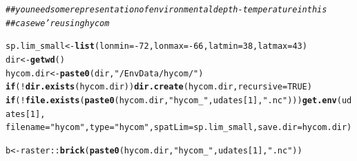 \documentclass{article}\usepackage[]{graphicx}\usepackage[]{color}
\makeatletter
\newcommand{\hlnum}[1]{\textcolor[rgb]{0.686,0.059,0.569}{#1}}%
\newcommand{\hlstr}[1]{\textcolor[rgb]{0.192,0.494,0.8}{#1}}%
\newcommand{\hlcom}[1]{\textcolor[rgb]{0.678,0.584,0.686}{\textit{#1}}}%
\newcommand{\hlopt}[1]{\textcolor[rgb]{0,0,0}{#1}}%
\newcommand{\hlstd}[1]{\textcolor[rgb]{0.345,0.345,0.345}{#1}}%
\newcommand{\hlkwa}[1]{\textcolor[rgb]{0.161,0.373,0.58}{\textbf{#1}}}%
\newcommand{\hlkwb}[1]{\textcolor[rgb]{0.69,0.353,0.396}{#1}}%
\newcommand{\hlkwc}[1]{\textcolor[rgb]{0.333,0.667,0.333}{#1}}%
\newcommand{\hlkwd}[1]{\textcolor[rgb]{0.737,0.353,0.396}{\textbf{#1}}}%
\newenvironment{kframe}{%
 \def\at@end@of@kframe{}%
 \ifinner\ifhmode%
  \def\at@end@of@kframe{\end{minipage}}%
  \begin{minipage}{\columnwidth}%
 \fi\fi%
 \def\FrameCommand##1{\hskip\@totalleftmargin \hskip-\fboxsep
 \colorbox{shadecolor}{##1}\hskip-\fboxsep
     \hskip-\linewidth \hskip-\@totalleftmargin \hskip\columnwidth}%
 \MakeFramed {\advance\hsize-\width
   \@totalleftmargin\z@ \linewidth\hsize
   \@setminipage}}%
 {\par\unskip\endMakeFramed%
 \at@end@of@kframe}
\newenvironment{knitrout}{}{} %
\makeatother
\begin{document}
\begin{knitrout}\small
{}\color{fgcolor}\begin{kframe}
\begin{alltt}
\hlcom{## you need some representation of environmental depth-temperature in this}
\hlcom{## case we're using hycom}

\hlstd{sp.lim_small} \hlkwb{<-} \hlkwd{list}\hlstd{(}\hlkwc{lonmin} \hlstd{=} \hlopt{-}\hlnum{72}\hlstd{,} \hlkwc{lonmax} \hlstd{=} \hlopt{-}\hlnum{66}\hlstd{,} \hlkwc{latmin} \hlstd{=} \hlnum{38}\hlstd{,} \hlkwc{latmax} \hlstd{=} \hlnum{43}\hlstd{)}
\hlstd{dir} \hlkwb{<-} \hlkwd{getwd}\hlstd{()}
\hlstd{hycom.dir} \hlkwb{<-} \hlkwd{paste0}\hlstd{(dir,} \hlstr{"/EnvData/hycom/"}\hlstd{)}
\hlkwa{if} \hlstd{(}\hlopt{!}\hlkwd{dir.exists}\hlstd{(hycom.dir))} \hlkwd{dir.create}\hlstd{(hycom.dir,} \hlkwc{recursive} \hlstd{=} \hlnum{TRUE}\hlstd{)}
\hlkwa{if} \hlstd{(}\hlopt{!}\hlkwd{file.exists}\hlstd{(}\hlkwd{paste0}\hlstd{(hycom.dir,} \hlstr{"hycom_"}\hlstd{, udates[}\hlnum{1}\hlstd{],} \hlstr{".nc"}\hlstd{)))} \hlkwd{get.env}\hlstd{(udates[}\hlnum{1}\hlstd{],}
    \hlkwc{filename} \hlstd{=} \hlstr{"hycom"}\hlstd{,} \hlkwc{type} \hlstd{=} \hlstr{"hycom"}\hlstd{,} \hlkwc{spatLim} \hlstd{= sp.lim_small,} \hlkwc{save.dir} \hlstd{= hycom.dir)}

\hlstd{b} \hlkwb{<-} \hlstd{raster}\hlopt{::}\hlkwd{brick}\hlstd{(}\hlkwd{paste0}\hlstd{(hycom.dir,} \hlstr{"hycom_"}\hlstd{, udates[}\hlnum{1}\hlstd{],} \hlstr{".nc"}\hlstd{))}
\end{alltt}



\end{kframe}
\end{knitrout}
\end{document}
